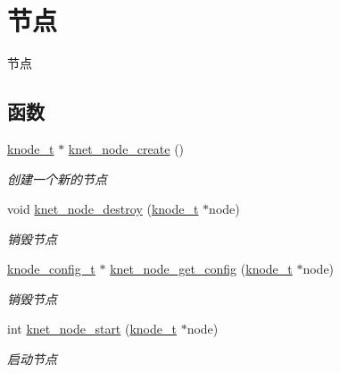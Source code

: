 \hypertarget{a00135}{}\section{节点}
\label{a00135}


节点  


\subsection*{函数}
\begin{DoxyCompactItemize}
\item 
\hyperlink{a00066_a5e720b27efbc9ad744240f5f4233763a_a5e720b27efbc9ad744240f5f4233763a}{knode\+\_\+t} $\ast$ \hyperlink{a00135_ga178be792592fd4557bfe931b5845b66a_ga178be792592fd4557bfe931b5845b66a}{knet\+\_\+node\+\_\+create} ()
\begin{DoxyCompactList}\small\item\em 创建一个新的节点 \end{DoxyCompactList}\item 
void \hyperlink{a00135_ga7b577b6a8883b8c69cfc2d9eadb98d03_ga7b577b6a8883b8c69cfc2d9eadb98d03}{knet\+\_\+node\+\_\+destroy} (\hyperlink{a00066_a5e720b27efbc9ad744240f5f4233763a_a5e720b27efbc9ad744240f5f4233763a}{knode\+\_\+t} $\ast$node)
\begin{DoxyCompactList}\small\item\em 销毁节点 \end{DoxyCompactList}\item 
\hyperlink{a00066_af1cfaee0eb1c76ebf06076b95cc47ee1_af1cfaee0eb1c76ebf06076b95cc47ee1}{knode\+\_\+config\+\_\+t} $\ast$ \hyperlink{a00135_ga2ceebf25bbc4306817d7ef45ca1c44b8_ga2ceebf25bbc4306817d7ef45ca1c44b8}{knet\+\_\+node\+\_\+get\+\_\+config} (\hyperlink{a00066_a5e720b27efbc9ad744240f5f4233763a_a5e720b27efbc9ad744240f5f4233763a}{knode\+\_\+t} $\ast$node)
\begin{DoxyCompactList}\small\item\em 销毁节点 \end{DoxyCompactList}\item 
int \hyperlink{a00135_gac3884a7a111f4fff8aad997d41e92712_gac3884a7a111f4fff8aad997d41e92712}{knet\+\_\+node\+\_\+start} (\hyperlink{a00066_a5e720b27efbc9ad744240f5f4233763a_a5e720b27efbc9ad744240f5f4233763a}{knode\+\_\+t} $\ast$node)
\begin{DoxyCompactList}\small\item\em 启动节点 \end{DoxyCompactList}\item 

\end{DoxyCompactItemize}

